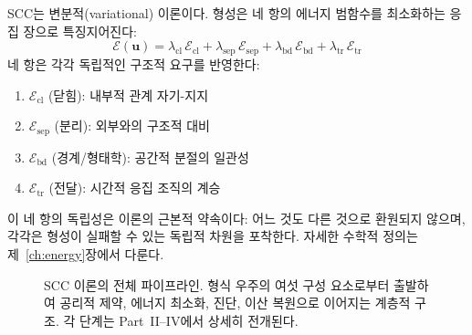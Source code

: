 SCC는 변분적(variational) 이론이다. 형성은 네 항의 에너지 범함수를 최소화하는 응집 장으로 특징지어진다:
\begin{equation}
    \mathcal{E}(\mathbf{u}) = \lambda_{\mathrm{cl}}\, \mathcal{E}_{\mathrm{cl}} + \lambda_{\mathrm{sep}}\, \mathcal{E}_{\mathrm{sep}} + \lambda_{\mathrm{bd}}\, \mathcal{E}_{\mathrm{bd}} + \lambda_{\mathrm{tr}}\, \mathcal{E}_{\mathrm{tr}}
    \label{eq:energy-preview}
\end{equation}
네 항은 각각 독립적인 구조적 요구를 반영한다:
\begin{enumerate}
    \item $\mathcal{E}_{\mathrm{cl}}$ (닫힘): 내부적 관계 자기-지지
    \item $\mathcal{E}_{\mathrm{sep}}$ (분리): 외부와의 구조적 대비
    \item $\mathcal{E}_{\mathrm{bd}}$ (경계/형태학): 공간적 분절의 일관성
    \item $\mathcal{E}_{\mathrm{tr}}$ (전달): 시간적 응집 조직의 계승
\end{enumerate}

이 네 항의 독립성은 이론의 근본적 약속이다: 어느 것도 다른 것으로 환원되지 않으며, 각각은 형성이 실패할 수 있는 독립적 차원을 포착한다. 자세한 수학적 정의는 제~\ref{ch:energy}장에서 다룬다.


\begin{figure}[p]
\centering
{}
\caption{SCC 이론의 전체 파이프라인. 형식 우주의 여섯 구성 요소로부터 출발하여 공리적 제약, 에너지 최소화, 진단, 이산 복원으로 이어지는 계층적 구조. 각 단계는 Part~II--IV에서 상세히 전개된다.}
\label{fig:theory-pipeline}
\end{figure}


